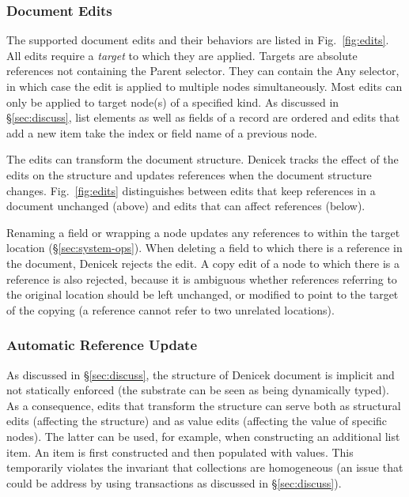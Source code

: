 \documentclass[sigconf]{acmart}
\newcommand{\note}[1]{}
\newcommand{\ident}[1]{{\sffamily #1}}
\begin{document}
\subsubsection*{Document Edits}
The supported document edits and their behaviors are listed in Fig.~\ref{fig:edits}. All edits
require a \emph{target} to which they are applied. Targets are absolute references not containing the
\ident{Parent} selector. They can contain the \ident{Any} selector, in which case the edit is applied
to multiple nodes simultaneously. Most edits can only be applied to target node(s) of a specified
kind. As discussed in \S\ref{sec:discuss}, list elements as well as fields of a record are ordered
and edits that add a new item take the index or field name of a previous node.

The edits can transform the document structure. Denicek tracks the effect of the edits on the
structure and updates references when the document structure changes.
Fig.~\ref{fig:edits} distinguishes between edits that keep references in a document unchanged
(above) and edits that can affect references (below).

Renaming a field or wrapping a node updates any references to within the target location
(\S\ref{sec:system-ops}). When deleting a field to which there is a reference in the document, Denicek
rejects the edit. A copy edit of a node to which there is a reference is also rejected, because it
is ambiguous whether references referring to the original location should be left unchanged,
or modified to point to the target of the copying (a reference cannot refer to two unrelated locations).



\subsubsection*{Automatic Reference Update}
As discussed in \S\ref{sec:discuss}, the structure of Denicek document is implicit and not
statically enforced (the substrate can be seen as being dynamically typed). As a consequence, edits
that transform the structure can serve both as structural edits (affecting the structure)
and as value edits (affecting the value of specific nodes). The latter can be used, for example,
when constructing an additional list item. An item is first constructed and then populated
with values. This temporarily violates the invariant that collections are homogeneous
(an issue that could be address by using transactions as discussed in \S\ref{sec:discuss}).
\end{document}
